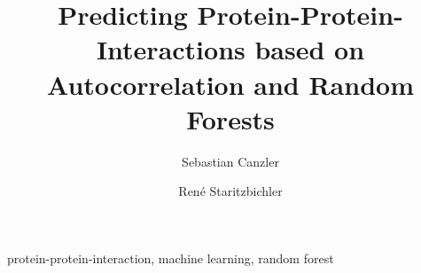 \documentclass[preprint,3p,times,twocolumn]{elsarticle}
\begin{document}
\begin{frontmatter}



\title{Predicting Protein-Protein-Interactions based on Autocorrelation and Random Forests}

\author[LEI]{Sebastian Canzler}
\author[PHY]{Ren\'{e} Staritzbichler}


\address[LEI]{Bioinformatics Group, Department of Computer Science,
  Leipzig University,
  H{\"a}rtelstra{\ss}e 16-18, D-04107 Leipzig, Germany
}
\address[PHY]{Institute of Medical Physics and Biophysics, University Leipzig,
    H{\"ä}rtelstraße 16-18, D-04107 Leipzig, Germany.}




\begin{abstract}
  
\end{abstract}

\begin{keyword}
  protein-protein-interaction, machine learning, random forest
\end{keyword}

\end{frontmatter}

\end{document}
